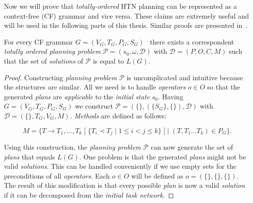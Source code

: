 \medskip\noindent
Now we will prove that \emph{totally-ordered} HTN planning can be represented as a context-free (CF) grammar and vice versa. These claims are extremely useful and will be used in the following parts of this thesis. Similar proofs are presented in~\cite{langclassification}.

\begin{thm}\label{thm02:3}
    For every CF grammar $G = (V_G, T_G, P_G, S_G)$~\cite{chytil} there exists a correspondent \emph{totally ordered planning problem} $\mathcal{P} = (s_0,\omega,\mathcal{D})$ with $\mathcal{D}=(P, O, C, M)$ such that the set of \emph{solutions} of $\mathcal{P}$ is equal to $L(G)$.
\end{thm}
\begin{proof}
    Constructing \emph{planning problem $\mathcal{P}$} is uncomplicated and intuitive because the structures are similar. All we need is to handle \emph{operators $o \in O$} so that the generated \emph{plans} are \emph{applicable} to the \emph{initial state} $s_0$. Having $G = (V_G,T_G,P_G,S_G)$ we construct $\mathcal{P} = (\{\}, (\{S_G\}, \{\}), \mathcal{D})$ with $\mathcal{D} = (\{\},T_G,V_G,M)$. \emph{Methods} are defined as follows:
    
    \[
    M = \{T \rightarrow T_1,\dots,T_k \; [ \; \{T_i \prec T_j \; | \; 1 \leq i < j \leq k\} \; ] \; | \; (T,T_1 \dots T_k) \in P_G\}.
    \]
    
    Using this construction, the \emph{planning problem $\mathcal{P}$} can now generate the set of \emph{plans} that equals $L(G)$. One problem is that the generated \emph{plans} might not be valid \emph{solutions}. This can be handled conveniently if we use empty sets for the preconditions of all \emph{operators}. Each $o \in O$ will be defined as $o = (\{\}, \{\}, \{\})$. The result of this modification is that every possible \emph{plan} is now a valid \emph{solution} if it can be decomposed from the \emph{initial task network}.
\end{proof}

